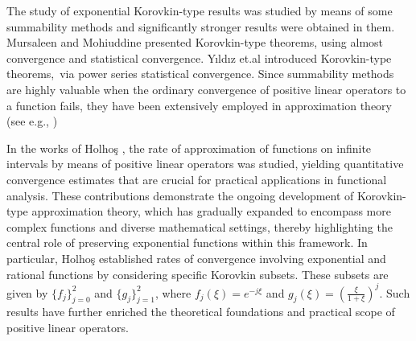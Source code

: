 \documentclass{amsart}
\theoremstyle{plain}
\numberwithin{equation}{section}
\begin{document}

The study of exponential Korovkin-type results was studied by means of some summability methods and significantly stronger results were obtained in them. Mursaleen and Mohiuddine
\cite{musaleen-moh} presented Korovkin-type theorems, using almost convergence and statistical convergence. Y\i ld\i z
et.al \cite{yildiz} introduced Korovkin-type theorems,\ via power series statistical convergence. Since
summability methods are highly valuable when the ordinary convergence of
positive linear operators to a function fails, they have been extensively
employed in approximation theory (see e.g., \cite{dinar-kadim, duman2007, gadjiev-orhan, soylemez-un2021, soy-guven, sumbul-yildirim, ulucay-un, unver-orhan2019, yildiz-demirci-2025 })

In the works of Holhoş \cite{holhos, holhos2018}, the  rate of approximation of functions on infinite intervals by means of positive linear operators was studied, yielding quantitative convergence estimates that are crucial for practical applications in functional analysis. These contributions demonstrate the ongoing development of Korovkin-type approximation theory, which has gradually expanded to encompass more complex functions and diverse mathematical settings, thereby highlighting the central role of preserving exponential functions within this framework. In particular, Holhoş \cite{holhos} established rates of convergence involving exponential and rational functions by considering specific Korovkin subsets. These subsets are given by $\{ f_{j} \}_{j=0}^{2}$ and $\{ g_{j} \}_{j=1}^{2}$, where $f_{j}(\xi)=e^{-j\xi}$ and $g_{j}(\xi)=\left(\frac{\xi}{1+\xi}\right)^{j}$. Such results have further enriched the theoretical foundations and practical scope of positive linear operators.
\end{document}
